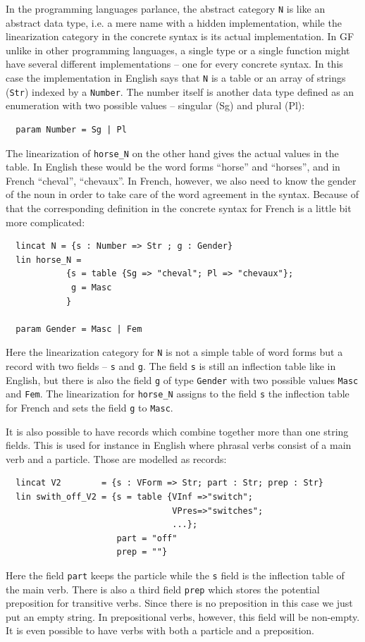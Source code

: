 \documentclass[output=paper]{LSP/langsci}
\begin{document}
In the programming languages parlance, the abstract category \verb=N= 
is like an abstract data type, i.e. a mere name with 
a hidden implementation, while the linearization category in 
the concrete syntax is its actual implementation. 
In GF unlike in other programming languages, a single type 
or a single function might have several different implementations -- 
one for every concrete syntax. In this case the implementation in 
English says that \verb=N= is a table or an array of 
strings (\verb=Str=) indexed by a \verb=Number=. 
The number itself is another data type defined as an enumeration 
with two possible values -- singular (Sg) and plural (Pl):
\begin{verbatim}
  param Number = Sg | Pl
\end{verbatim}

The linearization of \verb=horse_N= on the other hand gives 
the actual values in the table. In English these would be 
the word forms ``horse'' and ``horses'', and in 
French ``cheval'', ``chevaux''. In French, however, we also need to 
know the gender of the noun in order to take care of 
the word agreement in the syntax. Because of that 
the corresponding definition in the concrete syntax for French is a
little bit more complicated:
\begin{verbatim}
  lincat N = {s : Number => Str ; g : Gender}
  lin horse_N = 
            {s = table {Sg => "cheval"; Pl => "chevaux"};
             g = Masc
            }

  param Gender = Masc | Fem
\end{verbatim}
Here the linearization category for \verb=N= is not a simple table of 
word forms but a record with two fields -- \verb=s= and \verb=g=. 
The field \verb=s= is still an inflection table like in English, 
but there is also the field \verb=g= of type \verb=Gender= with 
two possible values \verb=Masc= and \verb=Fem=. The linearization 
for \verb=horse_N= assigns to the field \verb=s= the inflection table 
for French and sets the field \verb=g= to \verb=Masc=.

It is also possible to have records which combine together more than 
one string fields. This is used for instance in English 
where phrasal verbs consist of a main verb and a particle. 
Those are modelled as records:
\begin{verbatim}
  lincat V2        = {s : VForm => Str; part : Str; prep : Str}
  lin swith_off_V2 = {s = table {VInf =>"switch";
                                 VPres=>"switches";
                                 ...};
                      part = "off"
                      prep = ""}
\end{verbatim}
Here the field \verb=part= keeps the particle while the \verb=s= field is the inflection table of the main verb. There is also a third field \verb=prep= which stores the potential preposition for transitive verbs. Since there is no preposition in this case we just put an empty string. In prepositional verbs, however, this field will be non-empty. It is even possible to have verbs with both a particle and a preposition.
\end{document}
